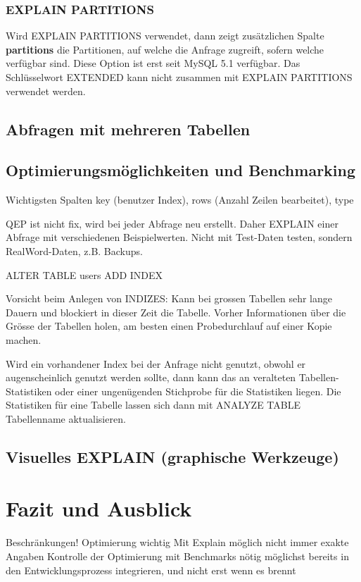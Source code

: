 \subsubsection{EXPLAIN PARTITIONS}
Wird EXPLAIN PARTITIONS verwendet, dann zeigt zusätzlichen Spalte \textbf{partitions} die Partitionen, auf welche die Anfrage zugreift, sofern welche verfügbar sind. Diese Option ist erst seit MySQL 5.1 verfügbar.
Das Schlüsselwort EXTENDED kann nicht zusammen mit EXPLAIN PARTITIONS verwendet werden.

\subsection{Abfragen mit mehreren Tabellen}
\subsection{Optimierungsmöglichkeiten und Benchmarking}
Wichtigsten Spalten key (benutzer Index), rows (Anzahl Zeilen bearbeitet), type

QEP ist nicht fix, wird bei jeder Abfrage neu erstellt. Daher EXPLAIN einer Abfrage mit verschiedenen Beispielwerten.
Nicht mit Test-Daten testen, sondern RealWord-Daten, z.B. Backups.

ALTER TABLE users ADD INDEX

Vorsicht beim Anlegen von INDIZES: Kann bei grossen Tabellen sehr lange Dauern und blockiert in dieser Zeit die Tabelle.
Vorher Informationen über die Grösse der Tabellen holen, am besten einen Probedurchlauf auf einer Kopie machen.

Wird ein vorhandener Index bei der Anfrage nicht genutzt, obwohl er augenscheinlich genutzt werden sollte, dann kann das an veralteten Tabellen-Statistiken oder einer ungenügenden Stichprobe für die Statistiken liegen. Die Statistiken für eine Tabelle lassen sich dann mit ANALYZE TABLE Tabellenname aktualisieren.

\subsection{Visuelles EXPLAIN (graphische Werkzeuge)}

\section{Fazit und Ausblick}

Beschränkungen!
Optimierung wichtig
Mit Explain möglich
nicht immer exakte Angaben
Kontrolle der Optimierung mit Benchmarks nötig
möglichst bereits in den Entwicklungsprozess integrieren, und nicht erst wenn es brennt
